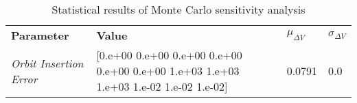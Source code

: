 
                    \begin{table}[]
                    \centering
                    \begin{tabular}{l l l l}
                    \rowcolor[HTML]{EFEFEF} \textbf{Parameter} & \textbf{Value} & \textbf{$\mu_{\Delta V}$} & \textbf{$\sigma_{\Delta V}$} \\
                    \textit{Orbit Insertion Error} & [0.e+00 0.e+00 0.e+00 0.e+00 0.e+00 0.e+00 1.e+03 1.e+03 1.e+03 1.e-02
 1.e-02 1.e-02] & 0.0791 & 0.0 \\

                    \end{tabular}
                    \caption{Statistical results of Monte Carlo sensitivity analysis}
                    \label{tab:SensitivityAnalysis}
                    \end{table}
                    